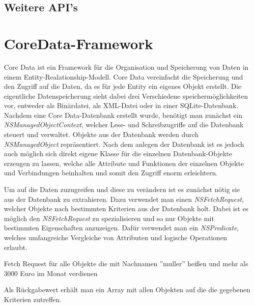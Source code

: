 \subsection{Weitere API's}
\label{sec:technologies:iosandxcode:otherapis}


\section{CoreData-Framework}
\label{sec:technologies:coredata}
Core Data ist ein Framework für die Organisation und Speicherung von Daten in einem Entity-Realationship-Modell.
Core Data vereinfacht die Speicherung und den Zugriff auf die Daten, da es für jede Entity ein eigenes Objekt erstellt.
Die eigentliche Datenspeicherung sieht dabei drei Verschiedene speichermöglichkeiten vor, entweder als Binärdatei, als XML-Datei oder in einer SQLite-Datenbank. 
Nachdem eine Core Data-Datenbank erstellt wurde, benötigt man zunächst ein \emph{NSManagedObjectContext}, welcher Lese- und Schreibzugriffe auf die Datenbank steuert und verwaltet.
Objekte aus der Datenbank werden durch \emph{NSManagedObject} repräsentiert. Nach dem anlegen der Datenbank ist es jedoch auch möglich sich direkt eigene Klasse für die einzelnen Datenbank-Objekte erzeugen zu lassen, welche alle Attribute und Funktionen der einzelnen Objekte und Verbindungen beinhalten und somit den Zugriff enorm erleichtern.

Um auf die Daten zuzugreifen und diese zu verändern ist es zunächst nötig sie aus der Datenbank zu extrahieren. Dazu verwendet man einen \emph{NSFetchRequest}, welcher Objekte nach bestimmten Kriterien aus der Datenbank holt.
Dabei ist es möglich den \emph{NSFetchRequest} zu spezialisieren und so nur Objekte mit bestimmten Eigenschaften anzuzeigen.
Dafür verwendet man ein \emph{NSPredicate}, welches umfangreiche Vergleiche von Attributen und logische Operationen erlaubt.

\begin{listing}[htb! breaklines=true]
    \caption{Fetch Request für alle Objekte die mit Nachnamen ''muller'' heißen und mehr als 3000 Euro im Monat verdienen}
	\label{lst:NSFetchRequest_objc}
\end{listing}

Als Rückgabewert erhält man ein Array mit allen Objekten auf die die gegebenen Kriterien zutreffen.
